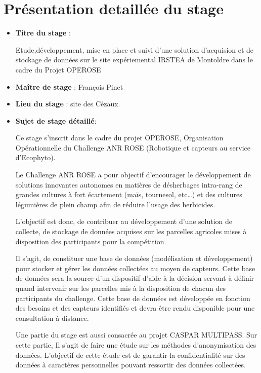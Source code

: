 \part{Présentation detaillée du stage}

\begin{itemize}

 \item \textbf{Titre du stage} :

 Etude,développement, mise en place  et suivi d'une solution d'acquision et de stockage de données sur le site expériemental IRSTEA de Montoldre dans le cadre du Projet OPEROSE
 \item \textbf{Maître de stage} : François Pinet
 \item \textbf{Lieu du stage} : site des Cézaux.

\item \textbf{Sujet de stage détaillé}: 

Ce stage s’inscrit dans le cadre du projet OPEROSE, Organisation Opérationnelle du Challenge ANR ROSE (Robotique et capteurs au service d’Ecophyto). 

Le Challenge ANR ROSE a pour objectif d’encourager le développement de solutions innovantes autonomes en matières de désherbages intra-rang de grandes cultures à fort écartement (maïs, tournesol, etc…) et des cultures légumières de plein champ afin de réduire l’usage des herbicides.

L’objectif est donc, de contribuer au développement d’une solution de collecte, de stockage de données acquises sur les parcelles agricoles mises à disposition des participants pour la compétition.

Il s’agit, de constituer une base de données (modélisation et développement) pour stocker et gérer les données collectées au moyen de capteurs. Cette base de données sera la source d’un dispositif d’aide à la décision servant à définir quand intervenir sur les parcelles mis à la disposition de chacun des participants du challenge. Cette base de données est développée en fonction des besoins et des capteurs identifiés et devra être rendu disponible pour une consultation à distance.

Une partie du stage est aussi consacrée au projet CASPAR MULTIPASS. Sur cette partie, Il s’agit de faire une étude sur les méthodes d’anonymisation des données. L’objectif de cette étude est de garantir la confidentialité sur des données à caractères personnelles pouvant ressortir des données collectées.

\end{itemize}
